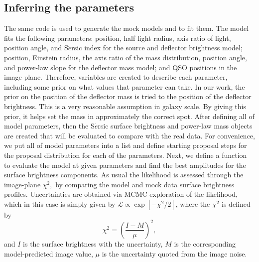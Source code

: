 \documentclass[a4paper,11pt]{article}
\begin{document}
\subsection{Inferring the parameters}
\label{ssec:inf}

The same code is used to generate the mock models and to fit them. The
model fits the following parameters: position, half light radius, axis ratio of light, position angle, and S$\acute{e}$rsic index for the source and deflector brightness model; position, Einstein radius, the axis ratio of the mass distribution, position angle, and power-law slope for the deflector mass model; and QSO positions in the image plane.
Therefore, variables are created to describe each parameter, including some prior on what values that parameter can take. In our work, the prior on the position of the deflector mass is tried to the position of the deflector brightness. This is a very reasonable assumption in galaxy scale. By giving this prior, it helps set the mass in approximately the correct spot. After defining all of model parameters, then the S$\acute{e}$rsic surface brightness and power-law mass objects are created that will be evaluated to compare with the real data. For convenience, we put all of model parameters into a list and define starting proposal steps for the proposal distribution for each of the parameters. Next, we define a function to evaluate the model at given parameters and find the best amplitudes for the surface brightness components.
As usual the likelihood is assessed through the
image-plane $\chi^{2},$ by comparing the model and mock data surface
brightness profiles.  Uncertainties are obtained via MCMC exploration
of the likelihood, which in this case is simply given by
$\mathcal{L}\propto\exp[-\chi^{2}/2]$, where the $\chi^{2}$ is defined by
%
\begin{equation}
   \label{eq:chi2}
   \chi^{2} = \left(\frac{I - M}{\mu}\right)^2 ,
\end{equation}
%
and $I$ is the surface brightness with the uncertainty, $M$ is the corresponding model-predicted image value, $\mu$ is the uncertainty quoted from the image noise.
\end{document}
